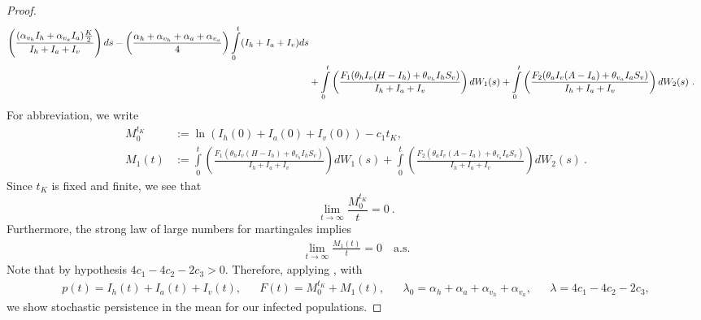 \begin{proof}
\begin{align}
						\left(
							\frac{
								(
									\alpha_{v_{h}} I_{h}
									+ \alpha_{v_{a}} I_{a}
								)
								\frac{K}{2}
							}
							{
								I_{h}+I_{a}+I_{v}
							}
						\right)
				ds
				-
				\left(
					\frac{
						\alpha_{h} + \alpha_{v_{h}}
						+ \alpha_{a} + \alpha_{v_{a}}
					}{4}
				\right)
				\int \limits_{0}^{t}
				(
					I_{h} + I_{a} + I_{v}
				)
				ds 
				\\
				&+
				\int\limits_{0}^{t}
					\left(
						\frac{
							F_{1}
							(
								\theta_{h} I_{v} (H-I_{h})
								+ \theta_{v_{h}} I_{h}S_{v})
						}
						{
							I_{h} + I_{a} + I_{v}
						}
					\right)
					dW_{1}(s)
				+
				\int
				\limits_{0}^{t}
				\left(
					\frac{
						F_{2}
						(
							\theta_{a} 
							I_{v} (A-I_{a})
							+ 
							\theta_{v_{a}} I_{a}S_{v}
						)
					}
					{
						I_{h} + I_{a} + I_{v}
					}
				\right)dW_{2}(s) ~. \notag
	\end{align}
	For abbreviation, we write
	\begin{align*}
		M_0^{t_K} &:=
		\ln(I_{h}(0) + I_{a}(0) + I_{v}(0)) - c_{1}t_{K},
		\\ 
		M_1(t) &:=
			\int\limits_{0}^{t}
			\left(
				\frac{F_{1}
				(
					\theta_{h} I_{v}
					(H-I_{h})
					+\theta_{v_{h}}I_{h}S_{v})
				}
				{
					I_{h} + I_{a} + I_{v}
				}
			\right)
			dW_{1}(s)
			+
			\int\limits_{0}^{t}
			\left(
				\frac{
					F_{2}
					(
						\theta_{a}I_{v}(A-I_{a})
						+\theta_{v_{a}}I_{a}S_{v}
					)
				}
				{
					I_{h} + I_{a} + I_{v}}
			\right)dW_{2}(s) ~.
	\end{align*}
	Since $t_K$ is fixed and finite, we see that
	$$
		\lim\limits_{t \to \infty}
			\frac{M_0^{t_K}}{t} = 0
			~.
	$$
	Furthermore, the strong law of large numbers for martingales 
	\citep[see e.g.,][Thm. 3.4]{Mao2007} implies
	\begin{align*}
		\lim
			\limits_{t \to \infty}\frac{M_1(t)}{t}=0  \quad \text{a.s.}
	\end{align*}
	Note that by hypothesis $ 4c_1 - 4 c_2 - 2 c_3 >0$.
	Therefore, applying ,
	with 
	\begin{align*}
		p(t)= 
			I_{h}(t)
			+I_{a}(t)
			+I_{v}(t),
		&&F(t)= 
			M_0^{t_K} + M_1(t), 
		&&\lambda_0 =
				\alpha_{h}
				+\alpha_{a} 
				+\alpha_{v_{h}}
				+\alpha_{v_{a}},
		&&\lambda = 
			4c_1 - 4 c_2 - 2 c_3,
	\end{align*}
	we show stochastic persistence in the mean for our infected populations.
\end{proof}